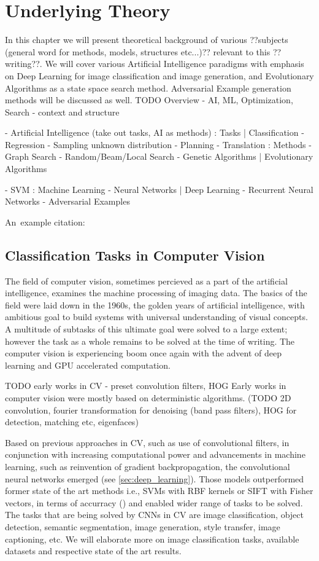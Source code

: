\chapter{Underlying Theory}
In this chapter we will present theoretical background of various ??subjects (general word for methods, models, structures etc...)?? relevant to this ??writing??. We will cover various Artificial Intelligence paradigms with emphasis on Deep Learning for image classification and image generation, and Evolutionary Algorithms as a state space search method. Adversarial Example generation methods will be discussed as well.
TODO Overview - AI, ML, Optimization, Search - context and structure

- Artificial Intelligence (take out tasks, AI as methods)
	: Tasks
		| Classification
		- Regression
		- Sampling unknown distribution
		- Planning
		- Translation
	: Methods
		- Graph Search
		- Random/Beam/Local Search
		- Genetic Algorithms
			| Evolutionary Algorithms

		- SVM
		: Machine Learning
			- Neural Networks
			| Deep Learning
			- Recurrent Neural Networks
- Adversarial Examples

An~example citation: \cite{Andel07}

\section{Classification Tasks in Computer Vision}
The field of computer vision, sometimes percieved as a part of the artificial intelligence, examines the machine processing of imaging data. The basics of the field were laid down in the 1960s, the golden years of artificial intelligence, with ambitious goal to build systems with universal understanding of visual concepts. A multitude of subtasks of this ultimate goal were solved to a large extent; however the task as a whole remains to be solved at the time of writing. The computer vision is experiencing boom once again with the advent of deep learning and GPU accelerated computation.

TODO early works in CV - preset convolution filters, HOG
Early works in computer vision were mostly based on deterministic algorithms. (TODO 2D convolution, fourier transformation for denoising (band pass filters), HOG for detection, matching etc, eigenfaces)

Based on previous approaches in CV, such as use of convolutional filters, in conjunction with increasing computational power and advancements in machine learning, such as reinvention of gradient backpropagation, the convolutional neural networks emerged (see \ref{sec:deep_learning}). Those models outperformed former state of the art methods i.e., SVMs with RBF kernels or SIFT with Fisher vectors, in terms of accurracy (\cite{NIPS2012_4824}) and enabled wider range of tasks to be solved. The tasks that are being solved by CNNs in CV are image classification, object detection, semantic segmentation, image generation, style transfer, image captioning, etc. We will elaborate more on image classification tasks, available datasets and respective state of the art results.


